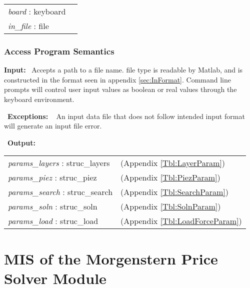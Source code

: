 \documentclass[12pt, titlepage]{article}
\begin{document}
\renewcommand*{\arraystretch}{1.5}
\begin{longtable}{p{} p{}}
  \textit{board} : keyboard & \\

  \textit{in\_file} : file & \\
\end{longtable}

\subsubsection{Access Program Semantics}
\textbf{Input:} ~\newline\noindent Accepts a path to a file name. file
type is readable by Matlab, and is constructed in the format seen in
appendix \ref{sec:InFormat}. Command line prompts will control user
input values as boolean or real values through the keyboard
environment.

~\newline\noindent \textbf{Exceptions:} ~\newline\noindent
An input data file that does not follow intended input format will
generate an input file error.

~\newline\noindent \textbf{Output:}
\renewcommand*{\arraystretch}{1.5}
\begin{longtable}{p{} p{}}
  \textit{params\_layers} : struc\_layers & (Appendix
  \ref{Tbl:LayerParam})\\

  \textit{params\_piez} : struc\_piez & (Appendix
  \ref{Tbl:PiezParam})\\

  \textit{params\_search} : struc\_search & (Appendix
  \ref{Tbl:SearchParam})\\

  \textit{params\_soln} : struc\_soln & (Appendix
  \ref{Tbl:SolnParam})\\

  \textit{params\_load} : struc\_load & (Appendix
  \ref{Tbl:LoadForceParam})
\end{longtable}



\section{MIS of the Morgenstern Price Solver Module} \label{sec:MPMod}
\end{document}

